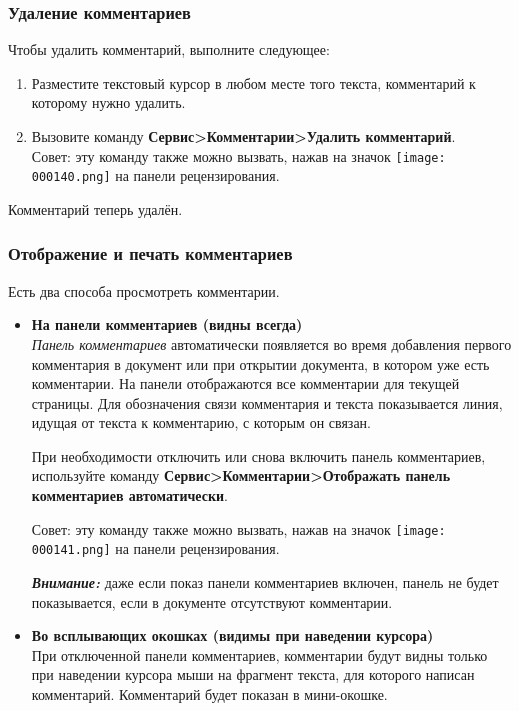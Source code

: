 ﻿\documentclass[a4paper,10pt]{article}
\begin{document}
\subsubsection{Удаление комментариев}
Чтобы удалить комментарий, выполните следующее:
\begin{enumerate}
 \item Разместите текстовый курсор в любом месте того текста, комментарий к которому нужно удалить.
 \item Вызовите команду \textbf{Сервис>Комментарии>Удалить комментарий}.\\
 Совет: эту команду также можно вызвать, нажав на значок \texttt{[image: 000140.png]} на панели рецензирования.
\end{enumerate}

Комментарий теперь удалён.

\subsubsection{Отображение и печать комментариев}
Есть два способа просмотреть комментарии.

\begin{itemize}
 \item \textbf{На панели комментариев (видны всегда)}\\
 \textit{Панель комментариев} автоматически появляется во время добавления первого комментария в документ или при открытии документа, в котором уже есть комментарии. На панели отображаются все комментарии для текущей страницы. Для обозначения связи комментария и текста показывается линия, идущая от текста к комментарию, с которым он связан.
 
 При необходимости отключить или снова включить панель комментариев, используйте команду \textbf{Сервис>Комментарии>Отображать панель комментариев автоматически}.
 
 Совет: эту команду также можно вызвать, нажав на значок \texttt{[image: 000141.png]} на панели рецензирования.
 
 \begin{mdframed}[backgroundcolor=blue!10]
\textbf{\textit{Внимание:}} даже если показ панели комментариев включен, панель не будет показывается, если в документе отсутствуют комментарии.
\end{mdframed}
\item \textbf{Во всплывающих окошках (видимы при наведении курсора)}\\
При отключенной панели комментариев, комментарии будут видны только при наведении курсора мыши на фрагмент текста, для которого написан комментарий. Комментарий будет показан в мини-окошке.
\end{itemize}
\end{document}
